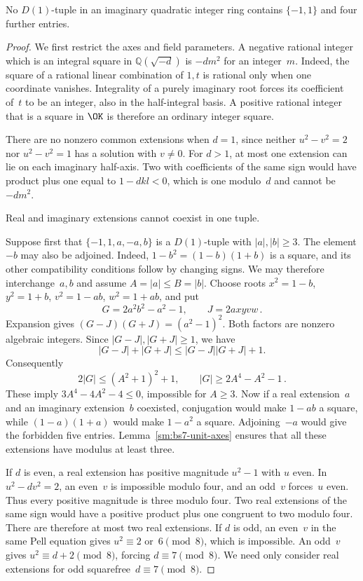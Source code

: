 \begin{lemma}\label{sm:bs7-unit-pair}
No $D(1)$-tuple in an imaginary quadratic integer ring contains $\{-1,1\}$ and four further entries.
\end{lemma}
\begin{proof}
We first restrict the axes and field parameters. A negative rational integer which is an integral square in $\mathbb Q(\sqrt{-d})$ is $-dm^2$ for an integer~$m$. Indeed, the square of a rational linear combination of $1,t$ is rational only when one coordinate vanishes. Integrality of a purely imaginary root forces its coefficient of~$t$ to be an integer, also in the half-integral basis. A positive rational integer that is a square in $\OK$ is therefore an ordinary integer square.

There are no nonzero common extensions when $d=1$, since neither $u^2-v^2=2$ nor $u^2-v^2=1$ has a solution with $v\ne0$. For $d>1$, at most one extension can lie on each imaginary half-axis. Two with coefficients of the same sign would have product plus one equal to $1-dkl<0$, which is one modulo~$d$ and cannot be $-dm^2$.

Real and imaginary extensions cannot coexist in one tuple.

Suppose first that $\{-1,1,a,-a,b\}$ is a $D(1)$-tuple with $|a|,|b|\ge3$. The element $-b$ may also be adjoined. Indeed, $1-b^2=(1-b)(1+b)$ is a square, and its other compatibility conditions follow by changing signs. We may therefore interchange~$a,b$ and assume $A=|a|\le B=|b|$. Choose roots $x^2=1-b$, $y^2=1+b$, $v^2=1-ab$, $w^2=1+ab$, and put
\begin{equation*}
 G=2a^2b^2-a^2-1,\qquad J=2axyvw\,.
\end{equation*}
Expansion gives $(G-J)(G+J)=(a^2-1)^2$. Both factors are nonzero algebraic integers. Since $|G-J|,|G+J|\ge1$, we have
\[
 |G-J|+|G+J|\le|G-J||G+J|+1.
\] Consequently
\begin{equation*}
 2|G|\le(A^2+1)^2+1,\qquad |G|\ge2A^4-A^2-1\,.
\end{equation*}
These imply $3A^4-4A^2-4\le0$, impossible for $A\ge3$. Now if a real extension~$a$ and an imaginary extension~$b$ coexisted, conjugation would make $1-ab$ a square, while $(1-a)(1+a)$ would make $1-a^2$ a square. Adjoining~$-a$ would give the forbidden five entries. Lemma~\ref{sm:bs7-unit-axes} ensures that all these extensions have modulus at least three.

If $d$ is even, a real extension has positive magnitude $u^2-1$ with $u$ even. In $u^2-dv^2=2$, an even~$v$ is impossible modulo four, and an odd~$v$ forces~$u$ even. Thus every positive magnitude is three modulo four. Two real extensions of the same sign would have a positive product plus one congruent to two modulo four. There are therefore at most two real extensions. If $d$ is odd, an even~$v$ in the same Pell equation gives $u^2\equiv2$ or~$6\pmod8$, which is impossible. An odd~$v$ gives $u^2\equiv d+2\pmod8$, forcing $d\equiv7\pmod8$. We need only consider real extensions for odd squarefree~$d\equiv7\pmod8$.


\end{proof}
